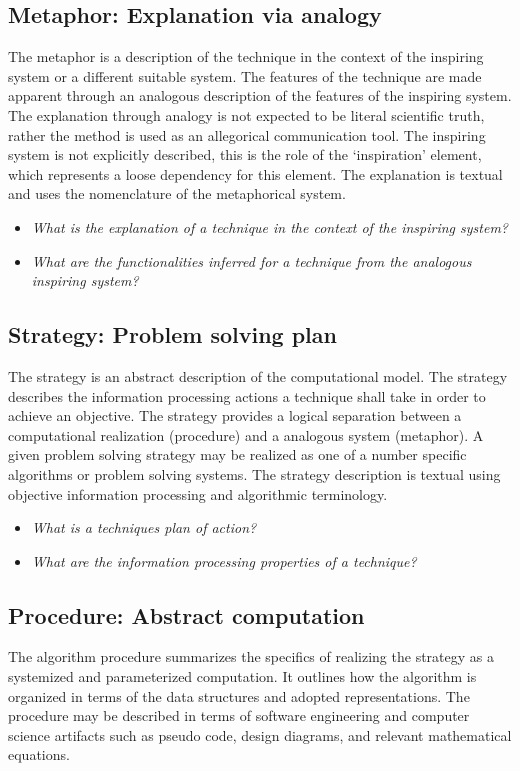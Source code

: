 \documentclass[a4paper, 11pt]{article}
\begin{document}
\subsection{Metaphor: Explanation via analogy}
The metaphor is a description of the technique in the context of the inspiring system or a different suitable system. The features of the technique are made apparent through an analogous description of the features of the inspiring system. The explanation through analogy is not expected to be literal scientific truth, rather the method is used as an allegorical communication tool. The inspiring system is not explicitly described, this is the role of the `inspiration' element, which represents a loose dependency for this element. The explanation is textual and uses the nomenclature of the metaphorical system. 

\begin{itemize}
	\item \emph{What is the explanation of a technique in the context of the inspiring system?}
	\item \emph{What are the functionalities inferred for a technique from the analogous inspiring system?}
\end{itemize}

\subsection{Strategy: Problem solving plan}
The strategy is an abstract description of the computational model. The strategy describes the information processing actions a technique shall take in order to achieve an objective. The strategy provides a logical separation between a computational realization (procedure) and a analogous system (metaphor). A given problem solving strategy may be realized as one of a number specific algorithms or problem solving systems. The strategy description is textual using objective information processing and algorithmic terminology.

\begin{itemize}
	\item \emph{What is a techniques plan of action?}
	\item \emph{What are the information processing properties of a technique?}
\end{itemize}

\subsection{Procedure: Abstract computation}
The algorithm procedure summarizes the specifics of realizing the strategy as a systemized and parameterized computation. It outlines how the algorithm is organized in terms of the data structures and adopted representations. The procedure may be described in terms of software engineering and computer science artifacts such as pseudo code, design diagrams, and relevant mathematical equations.
\end{document}
